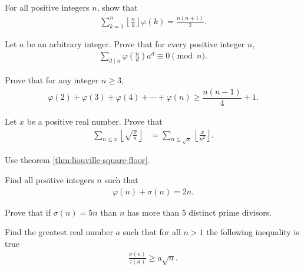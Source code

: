 \documentclass[12pt]{subfile}
\begin{document}
	\begin{problem}
		For all positive integers $n$, show that
			\begin{align*}
				\sum_{k=1}^n \left\lfloor \frac{n}{k} \right\rfloor \varphi(k) = \frac{n(n+1)}{2}.
			\end{align*}
	\end{problem}
	
	\begin{problem}
		Let $a$ be an arbitrary integer. Prove that for every positive integer $n$,
			\begin{align*}
				\sum_{d \mid n}\varphi\left(\frac{n}{d}\right)a^d\equiv0\pmod{n}.
			\end{align*}
	\end{problem}
	
	\begin{problem}
		Prove that for any integer $n \geq 3$,
			\begin{align*}
				\varphi(2)+\varphi(3)+\varphi(4)+\cdots+\varphi(n)\ge\dfrac{n(n-1)}{4}+1.
			\end{align*}
	\end{problem}
	
	\begin{problem}
		Let $x$ be a positive real number. Prove that
			\begin{align*}
				\sum_{n \leq x} \left\lfloor \sqrt{\frac{x}{n}} \right\rfloor &= \sum_{n\leq\sqrt x} \left\lfloor \frac{x}{n^2} \right\rfloor.
			\end{align*}
	\end{problem}
	
	\begin{hint}
		Use theorem \eqref{thm:liouville-square-floor}.
	\end{hint}

	\begin{problem} %
		Find all positive integers $n$ such that
			\begin{align*}
				\varphi(n) + \sigma(n) = 2n.
			\end{align*}
	\end{problem}

	\begin{problem} %
		Prove that if $\sigma(n)=5n$ than $n$ has more than $5$ distinct prime divisors.
	\end{problem}

	\begin{problem}[Belarus 2010] %
		Find the greatest real number $a$ such that for all $n>1$ the following inequality is true
			\begin{align*}
				\frac{\sigma (n)}{\tau (n)}\geq a\sqrt{n}.
			\end{align*}
	\end{problem}
\end{document}
